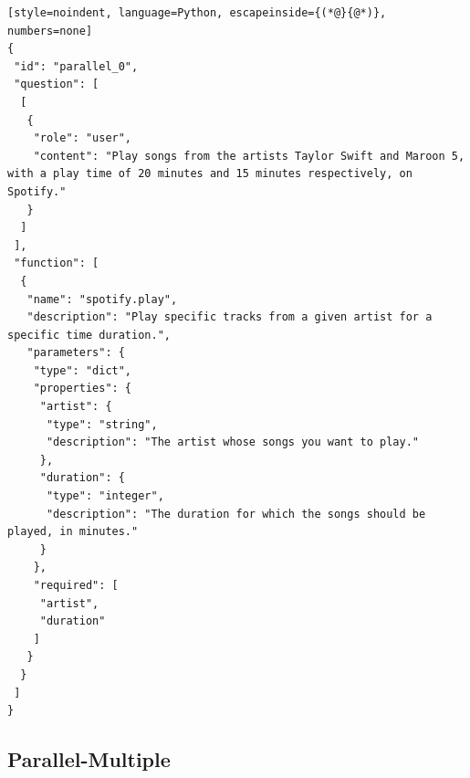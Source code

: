 \begin{lstlisting}[style=noindent, language=Python, escapeinside={(*@}{@*)}, numbers=none]
{
 "id": "parallel_0",
 "question": [
  [
   {
    "role": "user",
    "content": "Play songs from the artists Taylor Swift and Maroon 5, with a play time of 20 minutes and 15 minutes respectively, on Spotify."
   }
  ]
 ],
 "function": [
  {
   "name": "spotify.play",
   "description": "Play specific tracks from a given artist for a specific time duration.",
   "parameters": {
    "type": "dict",
    "properties": {
     "artist": {
      "type": "string",
      "description": "The artist whose songs you want to play."
     },
     "duration": {
      "type": "integer",
      "description": "The duration for which the songs should be played, in minutes."
     }
    },
    "required": [
     "artist",
     "duration"
    ]
   }
  }
 ]
}
\end{lstlisting}


\subsection{Parallel-Multiple} \mbox{}
\label{app:parallel-multiple_example}

